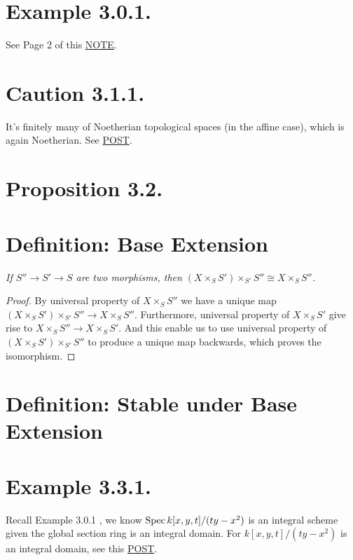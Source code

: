 \section{Example 3.0.1.}\label{Hart Chap 2 Example 3.0.1.}

See Page 2 of this \href{https://ocw.mit.edu/courses/18-726-algebraic-geometry-spring-2009/3723a99e97b581828fd782b9ffd83921_MIT18_726s09_lec11_more_schemes.pdf}{NOTE}.

\section{Caution 3.1.1.}

It's finitely many of Noetherian topological spaces (in the affine case), which is again Noetherian. See \href{https://math.stackexchange.com/questions/3388747/on-the-definition-of-noetherian-scheme}{POST}.

\section{Proposition 3.2.}

\section{Definition: Base Extension}

\textit{If $S''\to S'\to S$ are two morphisms, then $(X\times_S S')\times _{S'}S''\cong X\times_{S}S''$.}
\begin{proof}
By universal property of $X\times_S S''$ we have a unique map $(X\times_S S')\times _{S'}S''\to X\times_{S}S''$. Furthermore, universal property of $X\times_S S'$ give rise to $X\times_S S''\to X\times_S S'$. And this enable us to use universal property of $(X\times_S S')\times_{S'}S''$ to produce a unique map backwards, which proves the isomorphism.
\end{proof}

\section{Definition: Stable under Base Extension}

\section{Example 3.3.1.}

Recall Example 3.0.1 , we know $\operatorname{Spec} k[x,y,t]/(ty-x^2)$ is an integral scheme given the global section ring is an integral domain.
For $k[x,y,t]/(ty-x^2)$ is an integral domain, see this \href{https://math.stackexchange.com/questions/3320367/mathbbcx-y-z-xy-z2-is-not-a-field}{POST}. 

